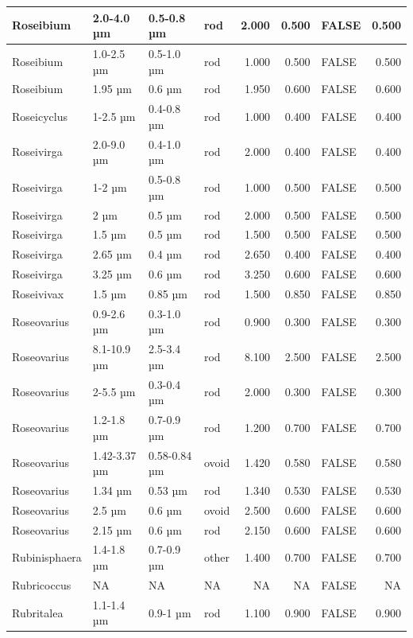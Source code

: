 \documentclass[
]{article}
\begin{document}
\begin{table}
\begin{tabular}{l|l|l|l|r|r|l|r}
\hline
Roseibium & 2.0-4.0 µm & 0.5-0.8 µm & rod & 2.000 & 0.500 & FALSE & 0.500\\
\hline
Roseibium & 1.0-2.5 µm & 0.5-1.0 µm & rod & 1.000 & 0.500 & FALSE & 0.500\\
\hline
Roseibium & 1.95 µm & 0.6 µm & rod & 1.950 & 0.600 & FALSE & 0.600\\
\hline
Roseicyclus & 1-2.5 µm & 0.4-0.8 µm & rod & 1.000 & 0.400 & FALSE & 0.400\\
\hline
Roseivirga & 2.0-9.0 µm & 0.4-1.0 µm & rod & 2.000 & 0.400 & FALSE & 0.400\\
\hline
Roseivirga & 1-2 µm & 0.5-0.8 µm & rod & 1.000 & 0.500 & FALSE & 0.500\\
\hline
Roseivirga & 2 µm & 0.5 µm & rod & 2.000 & 0.500 & FALSE & 0.500\\
\hline
Roseivirga & 1.5 µm & 0.5 µm & rod & 1.500 & 0.500 & FALSE & 0.500\\
\hline
Roseivirga & 2.65 µm & 0.4 µm & rod & 2.650 & 0.400 & FALSE & 0.400\\
\hline
Roseivirga & 3.25 µm & 0.6 µm & rod & 3.250 & 0.600 & FALSE & 0.600\\
\hline
Roseivivax & 1.5 µm & 0.85 µm & rod & 1.500 & 0.850 & FALSE & 0.850\\
\hline
Roseovarius & 0.9-2.6 µm & 0.3-1.0 µm & rod & 0.900 & 0.300 & FALSE & 0.300\\
\hline
Roseovarius & 8.1-10.9 µm & 2.5-3.4 µm & rod & 8.100 & 2.500 & FALSE & 2.500\\
\hline
Roseovarius & 2-5.5 µm & 0.3-0.4 µm & rod & 2.000 & 0.300 & FALSE & 0.300\\
\hline
Roseovarius & 1.2-1.8 µm & 0.7-0.9 µm & rod & 1.200 & 0.700 & FALSE & 0.700\\
\hline
Roseovarius & 1.42-3.37 µm & 0.58-0.84 µm & ovoid & 1.420 & 0.580 & FALSE & 0.580\\
\hline
Roseovarius & 1.34 µm & 0.53 µm & rod & 1.340 & 0.530 & FALSE & 0.530\\
\hline
Roseovarius & 2.5 µm & 0.6 µm & ovoid & 2.500 & 0.600 & FALSE & 0.600\\
\hline
Roseovarius & 2.15 µm & 0.6 µm & rod & 2.150 & 0.600 & FALSE & 0.600\\
\hline
Rubinisphaera & 1.4-1.8 µm & 0.7-0.9 µm & other & 1.400 & 0.700 & FALSE & 0.700\\
\hline
Rubricoccus & NA & NA & NA & NA & NA & FALSE & NA\\
\hline
Rubritalea & 1.1-1.4 µm & 0.9-1 µm & rod & 1.100 & 0.900 & FALSE & 0.900\\

\end{tabular}
\end{table}
\end{document}
